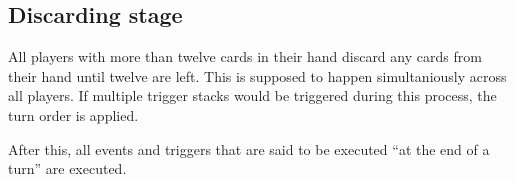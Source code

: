 \documentclass[a4paper,10pt]{article}
\begin{document}
\subsection{Discarding stage}

All players with more than twelve cards in their hand discard any cards from their hand
until twelve are left. This is supposed to happen simultaniously across all players. If
multiple trigger stacks would be triggered during this process, the turn order is applied.

After this, all events and triggers that are said to be executed ``at the end of a turn''
are executed.
\end{document}

